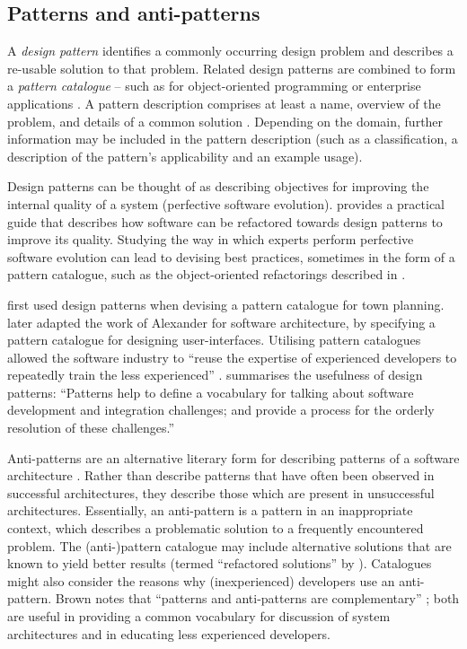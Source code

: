 \subsection{Patterns and anti-patterns}
\label{sec:LitReviewPatterns}
A \textit{design pattern} identifies a commonly occurring design problem and describes a re-usable solution to that problem. Related design patterns are combined to form a \textit{pattern catalogue} -- such as for object-oriented programming \cite{gamma95patterns} or enterprise applications \cite{fowler02patterns}. A pattern description comprises at least a name, overview of the problem, and details of a common solution \cite{brown98antipatterns}. Depending on the domain, further information may be included in the pattern description (such as a classification, a description of the pattern's applicability and an example usage).

Design patterns can be thought of as describing objectives for improving the internal quality of a system (perfective software evolution). \cite{kerievsky04refactoring} provides a practical guide that describes how software can be refactored towards design patterns to improve its quality. Studying the way in which experts perform perfective software evolution can lead to devising best practices, sometimes in the form of a pattern catalogue, such as the object-oriented refactorings described in \cite{fowler99refactoring}.

\cite{alexander77pattern} first used design patterns when devising a pattern catalogue for town planning. \cite{beck89constructing} later adapted the work of Alexander for software architecture, by specifying a pattern catalogue for designing user-interfaces. Utilising pattern catalogues allowed the software industry to ``reuse the expertise of experienced developers to repeatedly train the less experienced'' \cite[pg. 10]{brown98antipatterns}. \cite[pg. xii]{rising01designpatterns} summarises the usefulness of design patterns: ``Patterns help to define a vocabulary for talking about software development and integration challenges; and provide a process for the orderly resolution of these challenges.'' 

Anti-patterns are an alternative literary form for describing patterns of a software architecture \cite{brown98antipatterns}. Rather than describe patterns that have often been observed in successful architectures, they describe those which are present in unsuccessful architectures. Essentially, an anti-pattern is a pattern in an inappropriate context, which describes a problematic solution to a frequently encountered problem. The (anti-)pattern catalogue may include alternative solutions that are known to yield better results (termed ``refactored solutions'' by \cite{brown98antipatterns}). Catalogues might also consider the reasons why (inexperienced) developers use an anti-pattern. Brown notes that ``patterns and anti-patterns are complementary'' \cite[pg. 13]{brown98antipatterns}; both are useful in providing a common vocabulary for discussion of system architectures and in educating less experienced developers.



